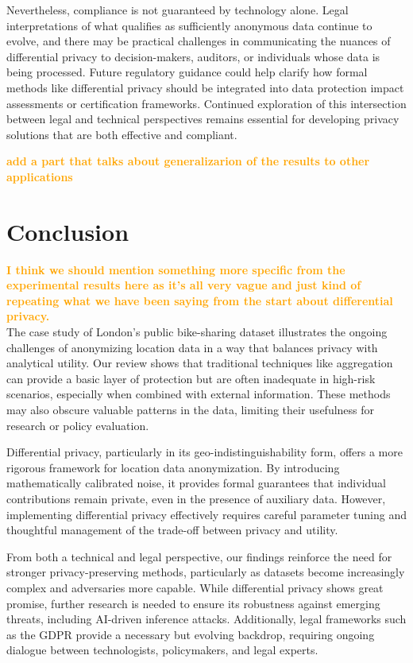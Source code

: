 \documentclass[twocolumn]{article}
\newcommand{\later}[1]{\textbf{\textcolor{orange}{#1}}}
\begin{document}
Nevertheless, compliance is not guaranteed by technology alone. Legal interpretations of what qualifies as sufficiently anonymous data continue to evolve, and there may be practical challenges in communicating the nuances of differential privacy to decision-makers, auditors, or individuals whose data is being processed. Future regulatory guidance could help clarify how formal methods like differential privacy should be integrated into data protection impact assessments or certification frameworks. Continued exploration of this intersection between legal and technical perspectives remains essential for developing privacy solutions that are both effective and compliant.


\later{add a part that talks about generalizarion of the results to other applications}


\section{Conclusion} \label{Conclusion}
\later{I think we should mention something more specific from the experimental results here as it's all very vague and just kind of repeating what we have been saying from the start about differential privacy.}\\
The case study of London's public bike-sharing dataset illustrates the ongoing challenges of anonymizing location data in a way that balances privacy with analytical utility. Our review shows that traditional techniques like aggregation can provide a basic layer of protection but are often inadequate in high-risk scenarios, especially when combined with external information. These methods may also obscure valuable patterns in the data, limiting their usefulness for research or policy evaluation.

Differential privacy, particularly in its geo-indistinguishability form, offers a more rigorous framework for location data anonymization. By introducing mathematically calibrated noise, it provides formal guarantees that individual contributions remain private, even in the presence of auxiliary data. However, implementing differential privacy effectively requires careful parameter tuning and thoughtful management of the trade-off between privacy and utility.

From both a technical and legal perspective, our findings reinforce the need for stronger privacy-preserving methods, particularly as datasets become increasingly complex and adversaries more capable. While differential privacy shows great promise, further research is needed to ensure its robustness against emerging threats, including AI-driven inference attacks. Additionally, legal frameworks such as the GDPR provide a necessary but evolving backdrop, requiring ongoing dialogue between technologists, policymakers, and legal experts.
\end{document}
